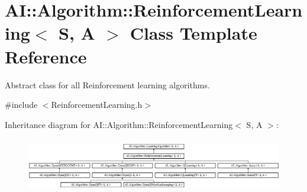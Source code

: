 \hypertarget{classAI_1_1Algorithm_1_1ReinforcementLearning}{\section{A\+I\+:\+:Algorithm\+:\+:Reinforcement\+Learning$<$ S, A $>$ Class Template Reference}
\label{classAI_1_1Algorithm_1_1ReinforcementLearning}
}


Abstract class for all Reinforcement learning algorithms.  




{\ttfamily \#include $<$Reinforcement\+Learning.\+h$>$}

Inheritance diagram for A\+I\+:\+:Algorithm\+:\+:Reinforcement\+Learning$<$ S, A $>$\+:\begin{figure}[H]
\begin{center}
\leavevmode
\includegraphics[height=2.397260cm]{classAI_1_1Algorithm_1_1ReinforcementLearning}
\end{center}
\end{figure}

